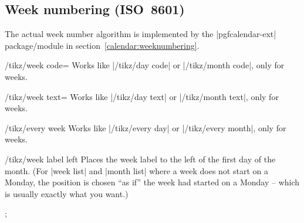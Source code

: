 \begin{multicols}{2}
\subsection{Week numbering (ISO~8601)}

The actual week number algorithm is implemented by the |pgfcalendar-ext| package/module in section~\ref{calendar:weeknumbering}.
\begin{key}{/tikz/week code=}
  Works like |/tikz/day code| or |/tikz/month code|, only for weeks.
\end{key}

\begin{key}{/tikz/week text=}
  Works like |/tikz/day text| or |/tikz/month text|, only for weeks.
\end{key}

\begin{stylekey}{/tikz/every week}
  Works like |/tikz/every day| or |/tikz/every month|, only for weeks.
\end{stylekey}

\begin{stylekey}{/tikz/week label left}
    Places the week label to the left of the first day of the month. (For
    |week list| and |month list| where a week does not start on a Monday, the
    position is chosen ``as if'' the week had started on a Monday --  which is
    usually exactly what you want.)
\begin{codeexample}[preamble={\usetikzlibrary{ext.calendar-plus}}]
\tikz
  \calendar [week list, month label above centered,
             dates=2022-07-01 to 2022-07-31,
             week label left,
             every week/.append style={gray!50!black,font=\sffamily}];
\end{codeexample}
\end{stylekey}

\end{multicols}
\endinput